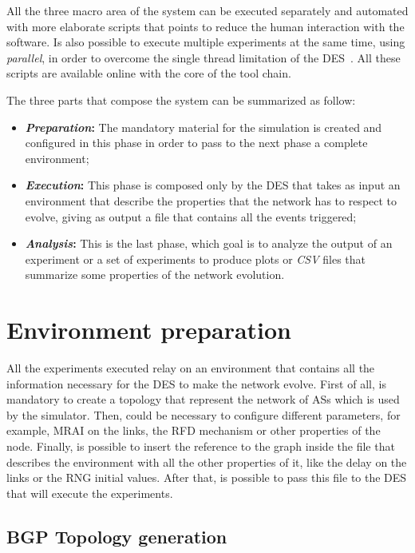 All the three macro area of the system can be executed separately and automated
with more elaborate scripts that points to reduce the human interaction with the
software.
Is also possible to execute multiple experiments at the same time, using
\textit{parallel}, in order to overcome the single thread limitation of the
\ac{DES}~\cite{Tange2011a}.
All these scripts are available online with the core of the tool chain.

The three parts that compose the system can be summarized as follow:
\begin{itemize}
		\item \textbf{\textit{Preparation}:} The mandatory material for the
				simulation is created and configured in this phase in order to
				pass to the next phase a complete environment;
		\item \textbf{\textit{Execution}:} This phase is composed only by the
				\ac{DES} that takes as input an environment that describe the
				properties that the network has to respect to evolve, giving as
				output a file that contains all the events triggered;
		\item \textbf{\textit{Analysis}:} This is the last phase, which goal
				is to analyze the output of an experiment or a set of experiments
				to produce plots or \textit{CSV} files that summarize some
				properties of the network evolution.
\end{itemize}

\section{Environment preparation}
\label{sec:exp_prep}

All the experiments executed relay on an environment that contains all
the information necessary for the \ac{DES} to make the network evolve.
First of all, is mandatory to create a topology that represent the network
of \acp{AS} which is used by the simulator.
Then, could be necessary to configure
different parameters, for example, \ac{MRAI} on the links, the
\ac{RFD} mechanism or other properties of the node.
Finally, is possible to insert the reference to the graph inside the file that
describes the environment with all the other properties of it, like the delay
on the links or the \ac{RNG} initial values.
After that, is possible to pass this file to the \ac{DES} that will execute
the experiments.

\subsection{BGP Topology generation}
\label{subsec:exp_topology_generation}

